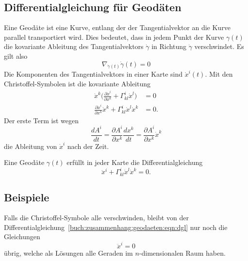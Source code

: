 %
%
\subsection{Differentialgleichung für Geodäten
\label{buch:zusammenhang:geodaeten:subsection:differentialgleichung}}
Eine Geodäte ist eine Kurve, entlang der der Tangentialvektor an die
Kurve parallel transportiert wird.
Dies bedeutet, dass in jedem Punkt der Kurve $\gamma(t)$ die kovariante
Ableitung des Tangentialvektors $\dot{\gamma}$ in Richtung
$\dot{\gamma}$ verschwindet.
Es gilt also
\[
\nabla_{\dot{\gamma}(t)} \dot{\gamma}(t)
=
0
\]
Die Komponenten des Tangentialvektors in einer Karte sind $\dot{x}^i(t)$.
Mit den Christoffel-Symbolen ist die kovariante Ableitung
\begin{align*}
\dot{x}^k
\biggl(
\frac{\partial\dot{x}^i}{\partial x^k}
+
\Gamma^i_{kl}\dot{x}^l
\biggr)
&=
0
\\
\frac{\partial\dot{x}^i}{\partial x^k}
\dot{x}^k
+
\Gamma^i_{kl} \dot{x}^l \dot{x}^k
&=
0.
\end{align*}
Der erste Term ist wegen
\[
\frac{dA^i}{dt}
=
\frac{\partial A^i}{\partial x^k}\frac{dx^k}{dt}
=
\frac{\partial A^i}{\partial x^k}
\dot{x}^k
\]
die Ableitung von $\dot{x}^i$ nach der Zeit.

\begin{satz}
Eine Geodäte $\gamma(t)$ erfüllt in jeder Karte die Differentialgleichung
\begin{equation}
\ddot{x}^i
+
\Gamma^i_{kl} \dot{x}^l \dot{x}^k
=
0.
\label{buch:zusammenhang:geodaeten:eqn:dgl}
\end{equation}
\end{satz}

%
%
\subsection{Beispiele
\label{buch:zusammenhang:geodaeten:subsection:beispiele}}
Falls die Christoffel-Symbole alle verschwinden, bleibt von der
Differentialgleichung~\eqref{buch:zusammenhang:geodaeten:eqn:dgl}
nur noch die Gleichungen
\[
\ddot{x}^i = 0
\]
übrig, welche als Lösungen alle Geraden im $n$-dimensionalen
Raum haben.

